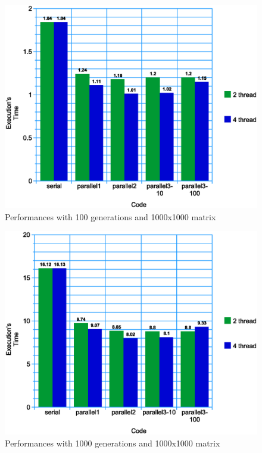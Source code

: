 \documentclass[a4paper,11pt,twoside]{report}
\begin{document}
\begin{figure}
	\centering
	\includegraphics[scale = 0.5]{1000-100.eps}
	\caption{Performances with 100 generations and 1000x1000 matrix} \label{fig:4}
\end{figure}
\begin{figure}
	\centering
	\includegraphics[scale = 0.5]{graph.eps}
	\caption{Performances with 1000 generations and 1000x1000 matrix} \label{fig:3}
\end{figure}
\end{document}
